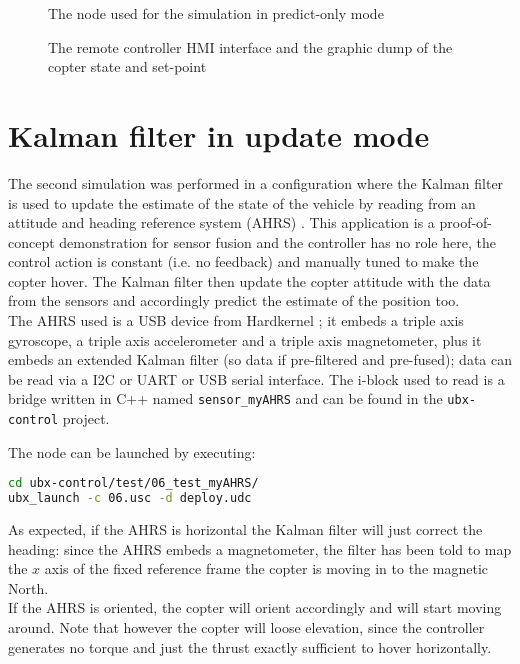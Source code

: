 \newpage
\begin{figure}
	\centering
	\caption{The node used for the simulation in predict-only mode}
	\label{fig:node040}
\end{figure}
\clearpage

\newpage
\begin{figure}
	\centering
	\caption{The remote controller HMI interface and the graphic dump of the copter state and set-point}
	\label{fig:gfxdump1}
\end{figure}
\clearpage


\section{Kalman filter in update mode}
The second simulation was performed in a configuration where the Kalman filter is used to update the estimate of the state of the vehicle by reading from an attitude and heading reference system (AHRS) \autocite{bib:wikiahrs}. This application is a proof-of-concept demonstration for sensor fusion and the controller has no role here, the control action is constant (i.e. no feedback) and manually tuned to make the copter hover. The Kalman filter then update the copter attitude with the data from the sensors and accordingly predict the estimate of the position too.\\
The AHRS used is a USB device from Hardkernel \autocite{bib:ahrsproduct}; it embeds a triple axis gyroscope, a triple axis accelerometer and a triple axis magnetometer, plus it embeds an extended Kalman filter (so data if pre-filtered and pre-fused); data can be read via a I2C or UART or USB serial interface. The i-block used to read is a bridge written in C++ named \texttt{sensor\_myAHRS} and can be found in the \texttt{ubx-control} project.

The node can be launched by executing:
\begin{lstlisting}[language=bash]
cd ubx-control/test/06_test_myAHRS/
ubx_launch -c 06.usc -d deploy.udc
\end{lstlisting}

As expected, if the AHRS is horizontal the Kalman filter will just correct the heading: since the AHRS embeds a magnetometer, the filter has been told to map the $x$ axis of the fixed reference frame the copter is moving in to the magnetic North.\\
If the AHRS is oriented, the copter will orient accordingly and will start moving around. Note that however the copter will loose elevation, since the controller generates no torque and just the thrust exactly sufficient to hover horizontally.\\

